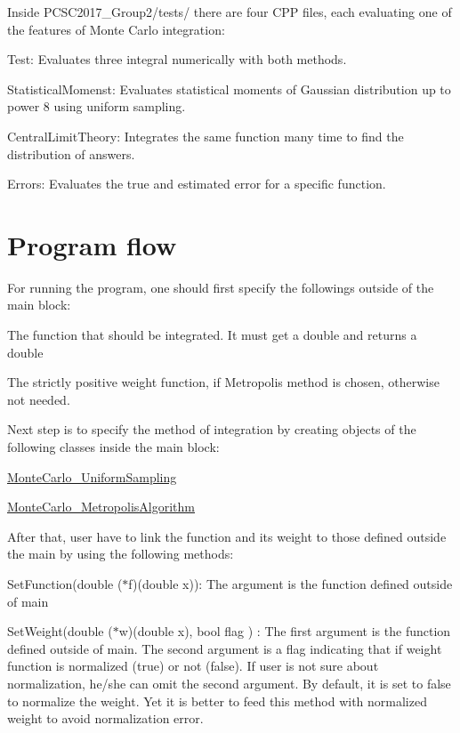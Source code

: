 Inside P\+C\+S\+C2017\+\_\+\+Group2/tests/ there are four C\+PP files, each evaluating one of the features of Monte Carlo integration\+:


\begin{DoxyEnumerate}
\item Test\+: Evaluates three integral numerically with both methods.
\item Statistical\+Momenst\+: Evaluates statistical moments of Gaussian distribution up to power 8 using uniform sampling.
\item Central\+Limit\+Theory\+: Integrates the same function many time to find the distribution of answers.
\item Errors\+: Evaluates the true and estimated error for a specific function.
\end{DoxyEnumerate}

\section*{Program flow}

For running the program, one should first specify the followings outside of the main block\+:
\begin{DoxyEnumerate}
\item The function that should be integrated. It must get a double and returns a double
\item The strictly positive weight function, if Metropolis method is chosen, otherwise not needed.
\end{DoxyEnumerate}

Next step is to specify the method of integration by creating objects of the following classes inside the main block\+:
\begin{DoxyEnumerate}
\item \hyperlink{class_monte_carlo___uniform_sampling}{Monte\+Carlo\+\_\+\+Uniform\+Sampling}
\item \hyperlink{class_monte_carlo___metropolis_algorithm}{Monte\+Carlo\+\_\+\+Metropolis\+Algorithm}
\end{DoxyEnumerate}

After that, user have to link the function and its weight to those defined outside the main by using the following methods\+:
\begin{DoxyEnumerate}
\item Set\+Function(double ($\ast$f)(double x))\+: The argument is the function defined outside of main
\item Set\+Weight(double ($\ast$w)(double x), bool flag ) \+: The first argument is the function defined outside of main. The second argument is a flag indicating that if weight function is normalized (true) or not (false). If user is not sure about normalization, he/she can omit the second argument. By default, it is set to false to normalize the weight. Yet it is better to feed this method with normalized weight to avoid normalization error.
\end{DoxyEnumerate}

